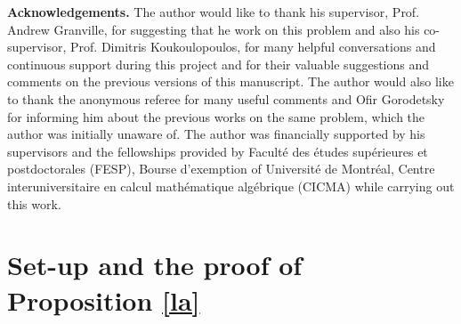 \documentclass[12pt]{amsart}
\numberwithin{equation}{section}
\theoremstyle{remark}
\theoremstyle{remark}
\theoremstyle{definition}
\begin{document}
\textbf{Acknowledgements. }The author would like to thank his supervisor, Prof. Andrew Granville, for suggesting that he work on this problem and also his co-supervisor, Prof. Dimitris Koukoulopoulos, for many helpful conversations and continuous support during this project and for their valuable suggestions and comments on the previous versions of this manuscript. The author would also like to thank the anonymous referee for many useful comments and Ofir Gorodetsky for informing him about the previous works on the same problem, which the author was initially unaware of. The author was financially supported by his supervisors and the fellowships provided by Faculté des études supérieures et postdoctorales (FESP), Bourse d'exemption of Université de Montréal, Centre interuniversitaire en calcul mathématique algébrique (CICMA) while carrying out this work.  
\section{Set-up and the proof of Proposition \ref{la}}
\end{document}
